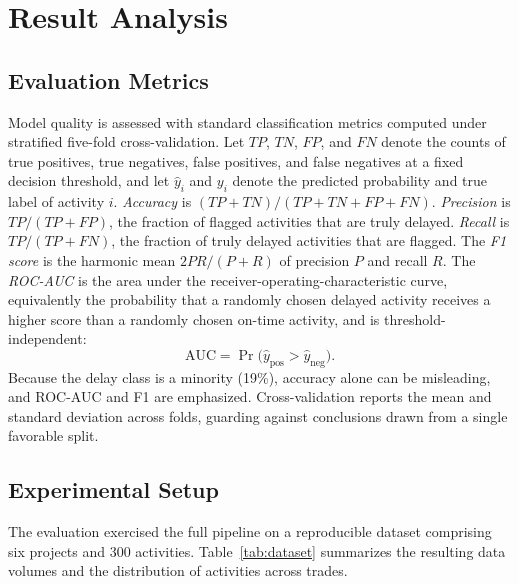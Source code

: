 \documentclass[conference]{IEEEtran}
\begin{document}
\section{Result Analysis}

\subsection{Evaluation Metrics}

Model quality is assessed with standard classification metrics computed under stratified five-fold cross-validation. Let $TP$, $TN$, $FP$, and $FN$ denote the counts of true positives, true negatives, false positives, and false negatives at a fixed decision threshold, and let $\hat{y}_i$ and $y_i$ denote the predicted probability and true label of activity $i$. \emph{Accuracy} is $(TP+TN)/(TP+TN+FP+FN)$. \emph{Precision} is $TP/(TP+FP)$, the fraction of flagged activities that are truly delayed. \emph{Recall} is $TP/(TP+FN)$, the fraction of truly delayed activities that are flagged. The \emph{F1 score} is the harmonic mean $2PR/(P+R)$ of precision $P$ and recall $R$. The \emph{ROC-AUC} is the area under the receiver-operating-characteristic curve, equivalently the probability that a randomly chosen delayed activity receives a higher score than a randomly chosen on-time activity, and is threshold-independent:
\begin{equation}
\mathrm{AUC} = \Pr\big(\hat{y}_{\text{pos}} > \hat{y}_{\text{neg}}\big).
\end{equation}
Because the delay class is a minority (19\%), accuracy alone can be misleading, and ROC-AUC and F1 are emphasized. Cross-validation reports the mean and standard deviation across folds, guarding against conclusions drawn from a single favorable split.

\subsection{Experimental Setup}

The evaluation exercised the full pipeline on a reproducible dataset comprising six projects and 300 activities. Table~\ref{tab:dataset} summarizes the resulting data volumes and the distribution of activities across trades.
\end{document}
